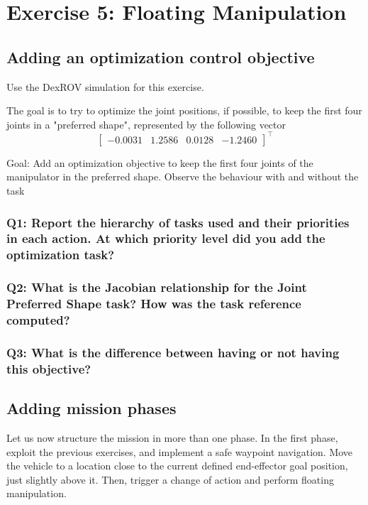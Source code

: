 \documentclass{article}
\begin{document}
\section{Exercise 5: Floating Manipulation}
\subsection{Adding an optimization control objective}
Use the DexROV simulation for this exercise.

The goal is to try to optimize the joint positions, if possible, to keep the first four joints in a "preferred shape", represented by the following vector
\begin{displaymath}
\begin{bmatrix}-0.0031 & 1.2586 & 0.0128 & -1.2460 \end{bmatrix}^\top
\end{displaymath}

Goal: Add an optimization objective to keep the first four joints of the manipulator in the preferred shape. Observe the behaviour with and without the task

\subsubsection{Q1: Report the hierarchy of tasks used and their priorities in each action. At which priority level did you add the optimization task?}

\subsubsection{Q2: What is the Jacobian relationship for the Joint Preferred Shape task? How was the task reference computed?}

\subsubsection{Q3: What is the difference between having or not having this objective?}

\subsection{Adding mission phases}
Let us now structure the mission in more than one phase. In the first phase, exploit the previous exercises, and implement a safe waypoint navigation. Move the vehicle to a location close to the current defined end-effector goal position, just slightly above it. Then, trigger a change of action and perform floating manipulation.
\end{document}
